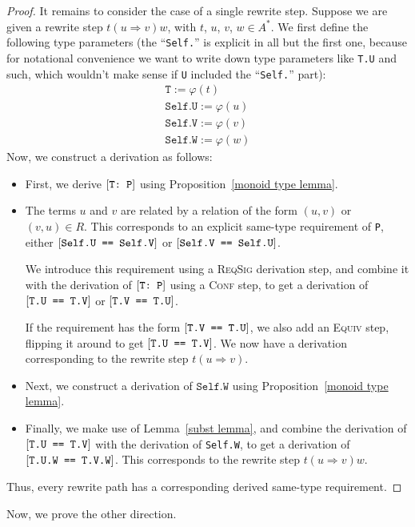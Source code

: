 \documentclass[../generics]{subfiles}
\begin{document}
\begin{proof}
It remains to consider the case of a single rewrite step. Suppose we are given a rewrite step $t(u\Rightarrow v)w$, with $t$, $u$, $v$, $w\in A^*$. We first define the following type parameters (the ``\texttt{Self.}'' is explicit in all but the first one, because for notational convenience we want to write down type parameters like \texttt{T.U} and such, which wouldn't make sense if \texttt{U} included the ``\texttt{Self.}'' part):
\begin{gather*}
\texttt{T} := \varphi(t)\\
\texttt{Self.U} := \varphi(u)\\
\texttt{Self.V} := \varphi(v)\\
\texttt{Self.W} := \varphi(w)
\end{gather*}
Now, we construct a derivation as follows:
\begin{itemize}
\item First, we derive $[\texttt{T:~P}]$ using Proposition~\ref{monoid type lemma}.
\item The terms $u$ and $v$ are related by a relation of the form $(u,v)$ or $(v,u)\in R$. This corresponds to an explicit same-type requirement of \texttt{P}, either $[\texttt{Self.U == Self.V}]$ or $[\texttt{Self.V == Self.U}]$.

We introduce this requirement using a \textsc{ReqSig} derivation step, and combine it with the derivation of $[\texttt{T:~P}]$ using a \textsc{Conf} step, to get a derivation of $[\texttt{T.U == T.V}]$ or $[\texttt{T.V == T.U}]$.

If the requirement has the form $[\texttt{T.V == T.U}]$, we also add an \textsc{Equiv} step, flipping it around to get $[\texttt{T.U == T.V}]$. We now have a derivation corresponding to the rewrite step $t(u\Rightarrow v)$.

\item Next, we construct a derivation of $\texttt{Self.W}$  using Proposition~\ref{monoid type lemma}.
\item Finally, we make use of Lemma~\ref{subst lemma}, and combine the derivation of $[\texttt{T.U == T.V}]$ with the derivation of \texttt{Self.W}, to get a derivation of $[\texttt{T.U.W == T.V.W}]$. This corresponds to the rewrite step $t(u\Rightarrow v)w$.
\end{itemize}
Thus, every rewrite path has a corresponding derived same-type requirement.
\end{proof}

Now, we prove the other direction.
\end{document}

